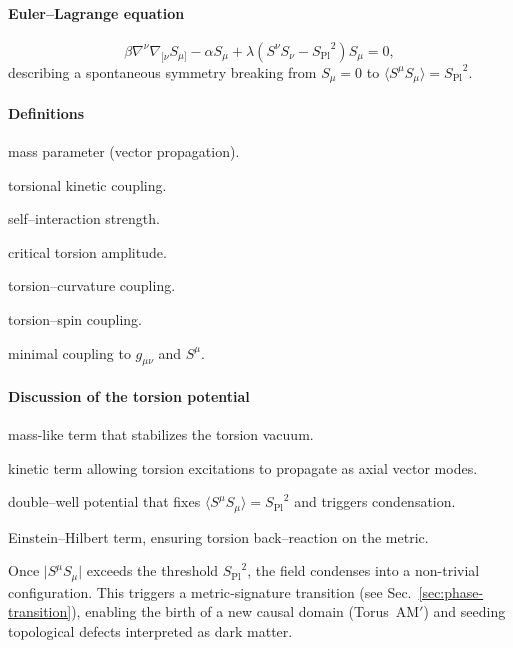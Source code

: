 \documentclass{article}
\newcommand{\Splanck}{\ensuremath{S_{\mathrm{Pl}}}}
\begin{document}
\paragraph{Euler--Lagrange equation}
\begin{equation}\label{eq:torsion-EOM}
  \beta \nabla^\nu \nabla_{[\nu} S_{\mu]} - \alpha S_\mu + \lambda (S^\nu S_\nu - \Splanck^2) S_\mu = 0,
\end{equation}
describing a spontaneous symmetry breaking from \(S_\mu = 0\) to \(\langle S^\mu S_\mu \rangle = \Splanck^2\).

\paragraph{Definitions}
\begin{description}[leftmargin=2em]
  \item[$\alpha$] mass parameter (vector propagation).
  \item[$\beta$] torsional kinetic coupling.
  \item[$\lambda$] self–interaction strength.
  \item[$\Splanck$] critical torsion amplitude.
  \item[$\xi$] torsion–curvature coupling.
  \item[$\eta$] torsion–spin coupling.
\item[\mbox{$\mathcal{L}_{\rm matter}[g, S^\mu]$}] minimal coupling to $g_{\mu\nu}$ and $S^\mu$.
 
\end{description}


\paragraph{Discussion of the torsion potential}
\begin{description}[leftmargin=2em]
  \item[\(\tfrac{\alpha}{2} S_\mu S^\mu\)] mass-like term that stabilizes the torsion vacuum.
  \item[\(\tfrac{\beta}{2}(\nabla_{[\mu} S_{\nu]})^2\)] kinetic term allowing torsion excitations to propagate as axial vector modes.
  \item[\(\tfrac{\lambda}{4}(S^\mu S_\mu - \Splanck^2)^2\)] double–well potential that fixes \(\langle S^\mu S_\mu \rangle = \Splanck^2\) and triggers condensation.
  \item[\(\tfrac1{2\kappa}R\)] Einstein–Hilbert term, ensuring torsion back–reaction on the metric.
  \item[Physical role] Once \(\vert S^\mu S_\mu \vert\) exceeds the threshold \(\Splanck^2\), the field condenses into a non-trivial configuration. This triggers a metric‐signature transition (see Sec.~\ref{sec:phase-transition}), enabling the birth of a new causal domain (Torus~AM$'$) and seeding topological defects interpreted as dark matter.
\end{description}
\end{document}
